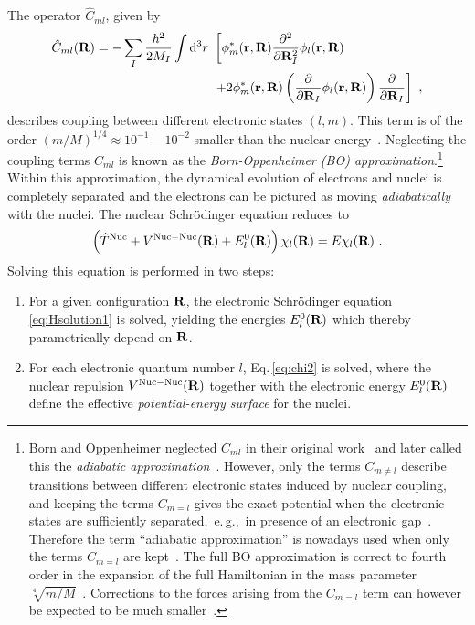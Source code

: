 The operator $\hat{C}_{ml}$, given by
\begin{align}
    \hat{C}_{ml} ({\bf R})
        = - \sum_I \frac{\hbar^2}{2 M_I} \int \d^3 r ~ 
        &\left[ \phi^\ast_m ({\bf r}, {\bf R}) \frac{\partial^2}{\partial {\bf R}_I^2}
            \phi_l ({\bf r}, {\bf R}) \right. \nonumber \\
        &\left.
            + 2 \phi^\ast_m ({\bf r}, {\bf R}) \left(
                \frac{\partial}{\partial {\bf R}_I} \phi_l ({\bf r}, {\bf R}) \right)
            \frac{\partial}{\partial {\bf R}_I}
        \right]~,
    \label{eq:Aml}
\end{align}
describes coupling between different electronic states $(l, m)$. This term is of the order $(m/M)^{1/4} \approx 10^{-1} - 10^{-2}$ smaller than the nuclear energy~\cite{BornOppenheimer}. Neglecting the coupling terms $C_{ml}$ is known as the \emph{Born-Oppenheimer (BO) approximation}.\footnote[][0em]{Born and Oppenheimer neglected $C_{ml}$ in their original work~\cite{BornOppenheimer} and later called this the \emph{adiabatic approximation}~\cite{BornHuang}. However, only the terms $C_{m \neq l}$ describe transitions between different electronic states induced by nuclear coupling, and keeping the terms $C_{m=l}$ gives the exact potential when the electronic states are sufficiently separated,~e.\,g.,~in presence of an electronic gap~\cite{Born1951kopplung}. Therefore the term ``adiabatic approximation'' is nowadays used when only the terms $C_{m=l}$ are kept~\cite{Marx2009}. The full BO approximation is correct to fourth order in the expansion of the full Hamiltonian in the mass parameter $\sqrt[4]{m/M}$~\cite{BornHuang}. Corrections to the forces arising from the $C_{m=l}$ term can however be expected to be much smaller~\cite{Ziman1955}.
} Within this approximation, the dynamical evolution of electrons and nuclei is completely separated and the electrons can be pictured as moving \emph{adiabatically} with the nuclei. The nuclear Schr\"odinger equation reduces to
\begin{align}
    \left( \hat{T}^{\rm Nuc} + V^{\mathrm{Nuc}-\mathrm{Nuc}} ({\bf R}) + E^0_l({\bf R}) \right) \chi_l ({\bf R})
        = E \chi_l ({\bf R})~.
    \label{eq:chi2}
\end{align}
Solving this equation is performed in two steps:
\begin{enumerate}
    \item For a given configuration $\bf R$, the electronic Schr\"odinger equation \eqref{eq:Hsolution1} is solved, yielding the energies $E^0_l({\bf R})$ which thereby parametrically depend on $\bf R$.
    \item For each electronic quantum number $l$, Eq.\,\eqref{eq:chi2} is solved, where the nuclear repulsion $V^{\mathrm{Nuc}-\mathrm{Nuc}} ({\bf R})$ together with the electronic energy $E^0_l({\bf R})$ define the effective \emph{potential-energy surface} for the nuclei.
\end{enumerate}

